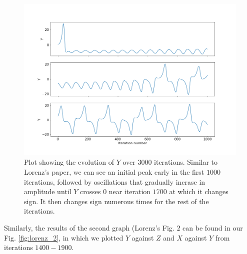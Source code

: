 \documentclass{article}
\begin{document}
\begin{figure}
    \hspace{-25mm}
    \includegraphics[scale=0.6]{lorenz_fig_1.png}
    \caption{Plot showing the evolution of $Y$ over $3000$ iterations. Similar to Lorenz's paper, we can see an initial peak early in the first $1000$ iterations, followed by oscillations that gradually incrase in amplitude until $Y$ crosses $0$ near iteration $1700$ at which it changes sign. It then changes sign numerous times for the rest of the iterations.}
    \label{fig:lorenz_1}
\end{figure}

Similarly, the results of the second graph (Lorenz's Fig. $2$ can be found in our Fig. \ref{fig:lorenz_2}, in which we plotted $Y$ against $Z$ and $X$ against $Y$ from iterations $1400 - 1900$. 
\end{document}

